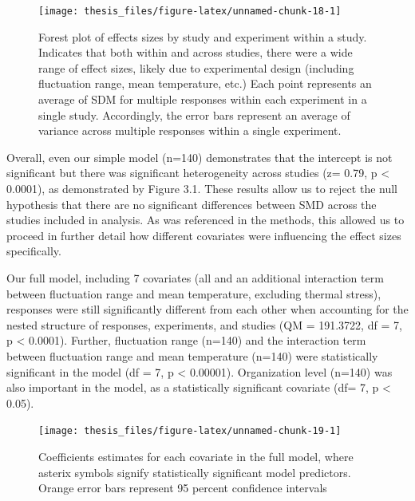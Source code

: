 \documentclass[12pt,twoside]{reedthesis}
\begin{document}
\begin{figure}

{\centering \texttt{[image: thesis\_files/figure-latex/unnamed-chunk-18-1]} 

}

\caption[Forest plot of effect sizes]{Forest plot of effects sizes by study and experiment within a study. Indicates that both within and across studies, there were a wide range of effect sizes, likely due to experimental design (including fluctuation range, mean temperature, etc.) Each point represents an average of SDM for multiple responses within each experiment in a single study. Accordingly, the error bars represent an average of variance across multiple responses within a single experiment.}\label{fig:unnamed-chunk-18}
\end{figure}
Overall, even our simple model (n=140) demonstrates that the intercept is not significant but there was significant heterogeneity across studies (z= 0.79, p \textless{} 0.0001), as demonstrated by Figure 3.1. These results allow us to reject the null hypothesis that there are no significant differences between SMD across the studies included in analysis. As was referenced in the methods, this allowed us to proceed in further detail how different covariates were influencing the effect sizes specifically.

Our full model, including 7 covariates (all and an additional interaction term between fluctuation range and mean temperature, excluding thermal stress), responses were still significantly different from each other when accounting for the nested structure of responses, experiments, and studies (QM = 191.3722, df = 7, p \textless{} 0.0001). Further, fluctuation range (n=140) and the interaction term between fluctuation range and mean temperature (n=140) were statistically significant in the model (df = 7, p \textless{} 0.00001). Organization level (n=140) was also important in the model, as a statistically significant covariate (df= 7, p \textless{} 0.05).
\begin{figure}

{\centering \texttt{[image: thesis\_files/figure-latex/unnamed-chunk-19-1]} 

}

\caption[Coefficient estimates for full model]{Coefficients estimates for each covariate in the full model, where asterix symbols signify statistically significant model predictors. Orange error bars represent 95 percent confidence intervals}\label{fig:unnamed-chunk-19}
\end{figure}
\clearpage
\end{document}

